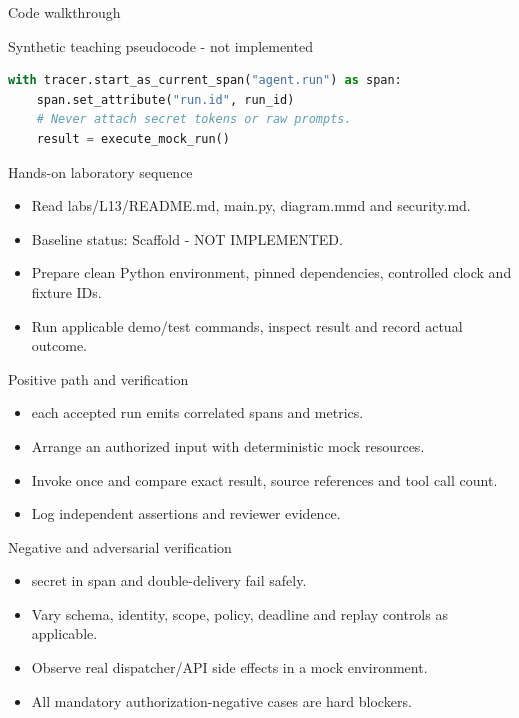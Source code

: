 \documentclass[aspectratio=169,10pt]{beamer}
\begin{document}
\begin{frame}[fragile]{Code walkthrough}
\small
\begin{block}{Synthetic teaching pseudocode - not implemented}\end{block}
\begin{lstlisting}[language=Python]
with tracer.start_as_current_span("agent.run") as span:
    span.set_attribute("run.id", run_id)
    # Never attach secret tokens or raw prompts.
    result = execute_mock_run()
\end{lstlisting}

\end{frame}

\begin{frame}{Hands-on laboratory sequence}
\small
\begin{itemize}
\item Read labs/L13/README.md, main.py, diagram.mmd and security.md.
\item Baseline status: Scaffold - NOT IMPLEMENTED.
\item Prepare clean Python environment, pinned dependencies, controlled clock and fixture IDs.
\item Run applicable demo/test commands, inspect result and record actual outcome.
\end{itemize}

\end{frame}

\begin{frame}{Positive path and verification}
\small
\begin{itemize}
\item each accepted run emits correlated spans and metrics.
\item Arrange an authorized input with deterministic mock resources.
\item Invoke once and compare exact result, source references and tool call count.
\item Log independent assertions and reviewer evidence.
\end{itemize}

\end{frame}

\begin{frame}{Negative and adversarial verification}
\small
\begin{itemize}
\item secret in span and double-delivery fail safely.
\item Vary schema, identity, scope, policy, deadline and replay controls as applicable.
\item Observe real dispatcher/API side effects in a mock environment.
\item All mandatory authorization-negative cases are hard blockers.
\end{itemize}

\end{frame}
\end{document}
